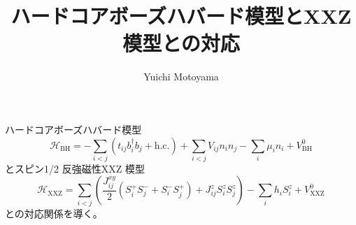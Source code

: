 \documentclass{jsarticle}
\title{ハードコアボーズハバード模型とXXZ 模型との対応}
\author{Yuichi Motoyama}
\begin{document}
\maketitle

ハードコアボーズハバード模型
\begin{equation}
  \mathcal{H}_\text{BH}
  =
  - \sum_{i<j}\left( t_{ij} b_i^\dagger b_j + \text{h.c.}\right)
  + \sum_{i<j}V_{ij} n_i n_j
  - \sum_i \mu_i n_i
  + V_\text{BH}^0
\end{equation}
とスピン1/2 反強磁性XXZ 模型
\begin{equation}
  \mathcal{H}_\text{XXZ}
  =
  \sum_{i<j}\left( \frac{J_{ij}^{xy}}{2} \left(S_i^+S_j^- + S_i^-S_j^+\right) + J_{ij}^z S_i^zS_j^z \right)
  - \sum_i h_i S_i^z
  + V_\text{XXZ}^0
\end{equation}
との対応関係を導く。
\end{document}
